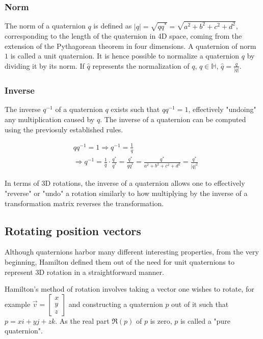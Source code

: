 \documentclass[12pt, a4paper]{article}
\begin{document}
\subsubsection{Norm}
The norm of a quaternion $q$ is defined as $|q| = \sqrt{qq^*} = \sqrt{a^2 + b^2
+ c^2 + d^2}$, corresponding to the length of the quaternion in 4D space, coming
from the extension of the Pythagorean theorem in four dimensions. A quaternion
of norm $1$ is called a unit quaternion. It is hence possible to normalize a
quaternion $q$ by dividing it by its norm. If $\hat{q}$ represents the
normalization of $q$, $q \in \mathbb{H}$, $\hat{q} = \frac{q}{|q|}$. \\

\pagebreak

\subsubsection{Inverse}
The inverse $q^{-1}$ of a quaternion $q$ exists such that $qq^{-1} = 1$,
effectively "undoing" any multiplication caused by $q$. The inverse of a
quaternion can be computed using the previosuly established rules.

\begin{align*}
     & qq^{-1} = 1 \Rightarrow q^{-1} = \frac{1}{q}         \\
     & \Rightarrow q^{-1} = \frac{1}{q} \cdot \frac{q^*}{q^*} = \frac{q^*}{qq^*}
    = \frac{q^*}{a^2 + b^2 + c^2 + d^2} = \frac{q^*}{|q|^2}
\end{align*}

In terms of 3D rotations, the inverse of a quaternion allows one to effectively
"reverse" or "undo" a rotation similarly to how multiplying by the inverse of a
transformation matrix reverses the transformation.

\subsection{Rotating position vectors}
Although quaternions harbor many different interesting properties, from the very
beginning, Hamilton defined them out of the need for unit quaternions to
represent 3D rotation in a straightforward manner.

Hamilton's method of rotation involves taking a vector one wishes to rotate, for
example $\vec{v} = \begin{bmatrix} x \\ y \\ z \end{bmatrix}$ and constructing a
quaternion $p$ out of it such that $p = xi + yj + zk$. As the real part $\Re(p)$
of $p$ is zero, $p$ is called a "pure quaternion". \\
\end{document}
